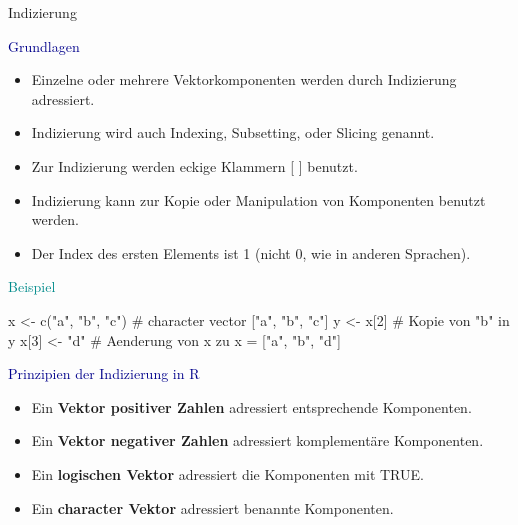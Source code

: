 \documentclass[
  8pt,
  ignorenonframetext,
]{beamer}
\newenvironment{Shaded}{\begin{snugshade}}{\end{snugshade}}
\newcommand{\CommentTok}[1]{\textcolor[rgb]{0.37,0.37,0.37}{#1}}
\newcommand{\DecValTok}[1]{\textcolor[rgb]{0.68,0.00,0.00}{#1}}
\newcommand{\FunctionTok}[1]{\textcolor[rgb]{0.28,0.35,0.67}{#1}}
\newcommand{\NormalTok}[1]{\textcolor[rgb]{0.00,0.23,0.31}{#1}}
\newcommand{\OtherTok}[1]{\textcolor[rgb]{0.00,0.23,0.31}{#1}}
\newcommand{\StringTok}[1]{\textcolor[rgb]{0.13,0.47,0.30}{#1}}
\providecommand{\tightlist}{%
  \setlength{\itemsep}{0pt}\setlength{\parskip}{0pt}}\usepackage{longtable,booktabs,array}
\begin{document}
\begin{frame}[fragile]{Indizierung}
\protect\hypertarget{indizierung-1}{}

\normalsize

\textcolor{darkblue}{Grundlagen} \vspace{-2mm}

\small

\begin{itemize}
\tightlist
\item
  Einzelne oder mehrere Vektorkomponenten werden durch Indizierung
  adressiert.
\item
  Indizierung wird auch Indexing, Subsetting, oder Slicing genannt.
\item
  Zur Indizierung werden eckige Klammern {[}\(\,\,\){]} benutzt.
\item
  Indizierung kann zur Kopie oder Manipulation von Komponenten benutzt
  werden.
\item
  Der Index des ersten Elements ist 1 (nicht 0, wie in anderen
  Sprachen).
\end{itemize}

\vspace{1mm}
\normalsize

\textcolor{darkcyan}{Beispiel} \tiny

\begin{Shaded}
\begin{Highlighting}[]
\NormalTok{x }\OtherTok{\textless{}{-}} \FunctionTok{c}\NormalTok{(}\StringTok{"a"}\NormalTok{, }\StringTok{"b"}\NormalTok{, }\StringTok{"c"}\NormalTok{)   }\CommentTok{\# character vector ["a", "b", "c"]}
\NormalTok{y }\OtherTok{\textless{}{-}}\NormalTok{ x[}\DecValTok{2}\NormalTok{]               }\CommentTok{\# Kopie von "b" in y}
\NormalTok{x[}\DecValTok{3}\NormalTok{] }\OtherTok{\textless{}{-}} \StringTok{"d"}             \CommentTok{\# Aenderung von x zu x = ["a", "b", "d"]}
\end{Highlighting}
\end{Shaded}

\vspace{1mm}
\normalsize

\textcolor{darkblue}{Prinzipien der Indizierung in R}

\small

\begin{itemize}
\tightlist
\item
  Ein \textbf{Vektor positiver Zahlen} adressiert entsprechende
  Komponenten.
\item
  Ein \textbf{Vektor negativer Zahlen} adressiert komplementäre
  Komponenten.
\item
  Ein \textbf{logischen Vektor} adressiert die Komponenten mit TRUE.
\item
  Ein \textbf{character Vektor} adressiert benannte Komponenten.
\end{itemize}
\end{frame}
\end{document}
